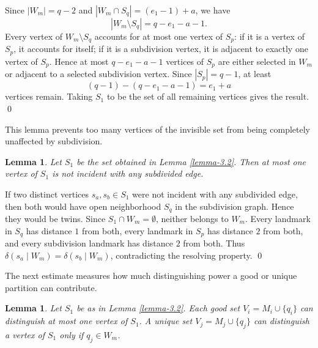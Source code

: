 \documentclass[12pt]{article}
\renewenvironment{proof}{{\bf \noindent Proof.}}{\qed}
\newtheorem{lemma}[theorem]{Lemma}
\begin{document}
\begin{proof}
Since $|W_m|=q-2$ and $|W_m\cap S_q|=(e_1-1)+a$, we have
$$
|W_m\setminus S_q|=q-e_1-a-1.
$$
Every vertex of $W_m\setminus S_q$ accounts for at most one vertex of $S_p$: if it is a vertex of $S_p$, it accounts for itself; if it is a subdivision vertex, it is adjacent to exactly one vertex of $S_p$. Hence at most $q-e_1-a-1$ vertices of $S_p$ are either selected in $W_m$ or adjacent to a selected subdivision vertex. Since $|S_p|=q-1$, at least
$$
(q-1)-(q-e_1-a-1)=e_1+a
$$
vertices remain. Taking $S_1$ to be the set of all remaining vertices gives the result.
\end{proof}

\medskip
\noindent This lemma prevents too many vertices of the invisible set from being completely unaffected by subdivision.
\begin{lemma}\label{lemma-3.3}
Let $S_1$ be the set obtained in Lemma \ref{lemma-3.2}. Then at most one vertex of $S_1$ is not incident with any subdivided edge.
\end{lemma}

\begin{proof}
If two distinct vertices $s_a,s_b\in S_1$ were not incident with any subdivided edge, then both would have open neighborhood $S_q$ in the subdivision graph. Hence they would be twins. Since $S_1\cap W_m=\emptyset$, neither belongs to $W_m$. Every landmark in $S_q$ has distance $1$ from both, every landmark in $S_p$ has distance $2$ from both, and every subdivision landmark has distance $2$ from both. Thus $\delta(s_a\mid W_m)=\delta(s_b\mid W_m)$, contradicting the resolving property.
\end{proof}

\medskip
\noindent The next estimate measures how much distinguishing power a good or unique partition can contribute.
\begin{lemma}\label{lemma-3.4}
Let $S_1$ be as in Lemma \ref{lemma-3.2}. Each good set $V_i=M_i\cup\{q_i\}$ can distinguish at most one vertex of $S_1$. A unique set $V_j=M_j\cup\{q_j\}$ can distinguish a vertex of $S_1$ only if $q_j\in W_m$.
\end{lemma}
\end{document}

